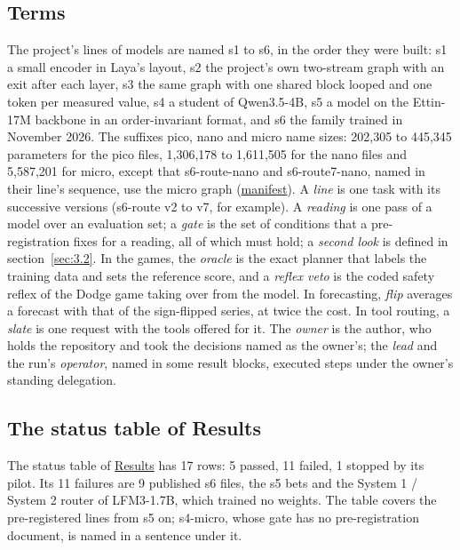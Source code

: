 \documentclass[10pt]{article}
\begin{document}
\subsection{Terms}\label{sec:A.1}

The project's lines of models are named s1 to s6, in the order they were built: s1 a small encoder in Laya's layout, s2 the project's own two-stream graph with an exit after each layer, s3 the same graph with one shared block looped and one token per measured value, s4 a student of Qwen3.5-4B, s5 a model on the Ettin-17M backbone in an order-invariant format, and s6 the family trained in November 2026. The suffixes pico, nano and micro name sizes: 202,305 to 445,345 parameters for the pico files, 1,306,178 to 1,611,505 for the nano files and 5,587,201 for micro, except that s6-route-nano and s6-route7-nano, named in their line's sequence, use the micro graph (\href{https://maxgfr.github.io/skycmd/models/manifest.json}{manifest}). A \emph{line} is one task with its successive versions (s6-route v2 to v7, for example). A \emph{reading} is one pass of a model over an evaluation set; a \emph{gate} is the set of conditions that a pre-registration fixes for a reading, all of which must hold; a \emph{second look} is defined in section~\ref{sec:3.2}. In the games, the \emph{oracle} is the exact planner that labels the training data and sets the reference score, and a \emph{reflex veto} is the coded safety reflex of the Dodge game taking over from the model. In forecasting, \emph{flip} averages a forecast with that of the sign-flipped series, at twice the cost. In tool routing, a \emph{slate} is one request with the tools offered for it. The \emph{owner} is the author, who holds the repository and took the decisions named as the owner's; the \emph{lead} and the run's \emph{operator}, named in some result blocks, executed steps under the owner's standing delegation.

\subsection{The status table of Results}\label{sec:A.2}

The status table of \href{https://maxgfr.github.io/skycmd/results/\#status}{Results} has 17 rows: 5 passed, 11 failed, 1 stopped by its pilot. Its 11 failures are 9 published s6 files, the s5 bets and the System 1 / System 2 router of LFM3-1.7B, which trained no weights. The table covers the pre-registered lines from s5 on; s4-micro, whose gate has no pre-registration document, is named in a sentence under it.
\end{document}
